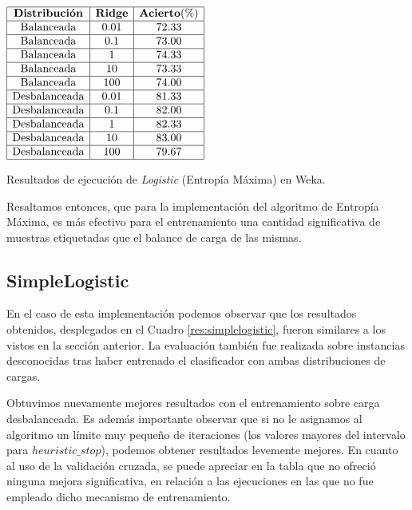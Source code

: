 \begin{table}[htb] 
\centering

$
\begin{array}{|c|c|c|}
      \hline
      \mathbf{Distribuci\acute{o}n} & \mathbf{Ridge} & \mathbf{Acierto(\%)} \\
      \hline
      \mathrm{Balanceada}	&	0.01	& 72.33	\\
      \hline
      \mathrm{Balanceada}	&	0.1		& 73.00	\\
      \hline
      \mathrm{Balanceada}	&	1		& 74.33	\\
      \hline
      \mathrm{Balanceada}	&	10		& 73.33	\\
      \hline
      \mathrm{Balanceada}	&	100		& 74.00	\\
      \hline
      \mathrm{Desbalanceada}	&	0.01	& 81.33	\\
      \hline
      \mathrm{Desbalanceada}	&	0.1		& 82.00	\\
      \hline
      \mathrm{Desbalanceada}	&	1		& 82.33	\\
      \hline
      \mathrm{Desbalanceada}	&	10		& 83.00	\\
      \hline
      \mathrm{Desbalanceada}	&	100		& 79.67	\\
      \hline
\end{array}
$
\caption{Resultados de ejecuci\'on de \textit{Logistic} (Entrop\'ia M\'axima) en Weka.}
\label{res:logistic}
\end{table}

Resaltamos entonces, que para la implementaci\'on del algoritmo de Entrop\'ia M\'axima, es m\'as efectivo para el entrenamiento una cantidad significativa de muestras etiquetadas que el balance de carga de las mismas.


\subsection{SimpleLogistic}

En el caso de esta implementaci\'on podemos observar que los resultados obtenidos, desplegados en el Cuadro \ref{res:simplelogistic}, fueron similares a los vistos en la secci\'on anterior. La evaluaci\'on tambi\'en fue realizada sobre instancias desconocidas tras haber entrenado el clasificador con ambas distribuciones de cargas. 
\newline

Obtuvimos nuevamente mejores resultados con el entrenamiento sobre carga desbalanceada. Es adem\'as importante observar que si no le asignamos al algoritmo un l\'imite muy peque\~no de iteraciones (los valores mayores del intervalo para $heuristic\_stop$), podemos obtener resultados levemente mejores. En cuanto al uso de la validaci\'on cruzada, se puede apreciar en la tabla que no ofreci\'o ninguna mejora significativa, en relaci\'on a las ejecuciones en las que no fue empleado dicho mecanismo de entrenamiento.

